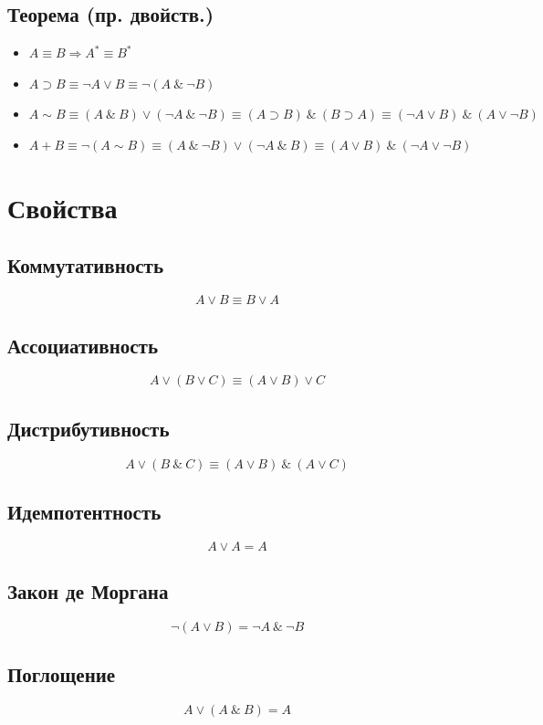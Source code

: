 \documentclass{article}
\begin{document}
\subsection{Теорема (пр. двойств.)}
\begin{itemize}
    \item $A \equiv B \Rightarrow A^* \equiv B^*$
    \item $A \supset B \equiv \neg A \vee B \equiv \neg (A ~\&~ \neg B)$
    \item $A \sim B \equiv (A ~\&~ B) \vee (\neg A ~\&~ \neg B) \equiv (A \supset B) ~\&~ (B \supset A) \equiv (\neg A \vee B) ~\&~ (A \vee \neg B)$
    \item $A + B \equiv \neg (A \sim B) \equiv (A ~\&~ \neg B) \vee (\neg A ~\&~ B) \equiv (A \vee B) ~\&~ (\neg A \vee \neg B)$
\end{itemize}



\section{Свойства}

\subsection{Коммутативность}
\[
    A \vee B \equiv B \vee A
\]

\subsection{Ассоциативность}
\[
    A \vee (B \vee C) \equiv (A \vee B) \vee C 
\]

\subsection{Дистрибутивность}
\[
    A \vee (B ~\&~ C) \equiv (A \vee B) ~\&~ (A \vee C)
\]

\subsection{Идемпотентность}
\[
    A \vee A = A
\]

\subsection{Закон де Моргана}
\[
    \neg (A \vee B) = \neg A ~\&~ \neg B
\]

\subsection{Поглощение}
\[
    A \vee (A ~\&~ B) = A
\]
\end{document}
